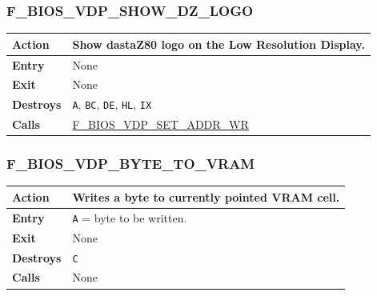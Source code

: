 \documentclass[a4paper,11pt]{article}
\begin{document}
        \subsubsection{F\_BIOS\_VDP\_SHOW\_DZ\_LOGO}
        \label{func:fbiosvdpshowdzlogo}
        \begin{tabular}{l p{9cm}}
            \hline\textbf{Action}
            & Show dastaZ80 logo on the \textbf{Low Resolution Display}.\\
            \hline\textbf{Entry} & None\\
            \hline\textbf{Exit} & None\\
            \hline\textbf{Destroys} & \texttt{A}, \texttt{BC}, \texttt{DE},
            \texttt{HL}, \texttt{IX} \\
            \hline\textbf{Calls} & \hyperref[func:fbiosvdpsetaddrwr]
            {F\_BIOS\_VDP\_SET\_ADDR\_WR}\\
            \hline
        \end{tabular}

        \subsubsection{F\_BIOS\_VDP\_BYTE\_TO\_VRAM}
        \label{func:fbiosvdpbytetovram}
        \begin{tabular}{l p{9cm}}
            \hline\textbf{Action}
            & Writes a byte to currently pointed \textbf{VRAM} cell.\\
            \hline\textbf{Entry} & \texttt{A} = byte to be written.\\
            \hline\textbf{Exit} & None\\
            \hline\textbf{Destroys} & \texttt{C} \\
            \hline\textbf{Calls} & None\\
            \hline
        \end{tabular}

\end{document}
